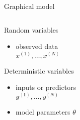 \documentclass[14pt]{beamer}
\begin{document}
\begin{frame}{Graphical model}

\begin{columns}
\begin{column}{0.6\textwidth}

Random variables
\begin{itemize}
	\item observed data \\
	$x^{(1)}, \ldots, x^{(N)}$
\end{itemize}

Deterministic variables
\begin{itemize}
	\item inputs or predictors \\
	$y^{(1)}, \ldots, y^{(N)}$
	\item model parameters $\theta$
\end{itemize}

\end{column}
\begin{column}{0.2\textwidth}
\end{column}

\end{columns}


\end{frame}
\end{document}
